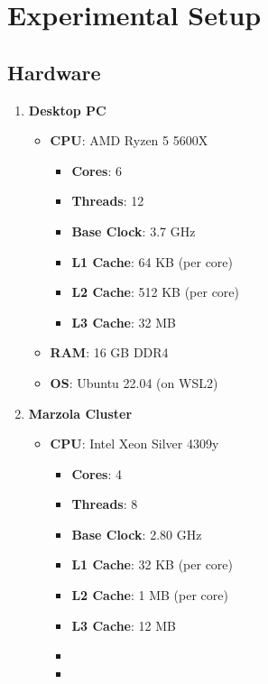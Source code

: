 \documentclass{article}
\begin{document}
\section{Experimental Setup}
\subsection{Hardware}
\begin{minipage}{\textwidth}
    \begin{multicols}{2}
        \raggedcolumns
        \begin{enumerate}
            \item \textbf{Desktop PC}
            \begin{itemize}
                \item \textbf{CPU}: AMD Ryzen 5 5600X
                \begin{itemize}
                    \item \textbf{Cores}: 6
                    \item \textbf{Threads}: 12
                    \item \textbf{Base Clock}: 3.7 GHz
                    \item \textbf{L1 Cache}: 64 KB (per core)
                    \item \textbf{L2 Cache}: 512 KB (per core)
                    \item \textbf{L3 Cache}: 32 MB
                \end{itemize}
                \item \textbf{RAM}: 16 GB DDR4
                \item \textbf{OS}: Ubuntu 22.04 (on WSL2)
            \end{itemize}
            \columnbreak
            \item \textbf{Marzola Cluster}
            \begin{itemize}
                \item \textbf{CPU}: Intel Xeon Silver 4309y
                \begin{itemize}
                    \item \textbf{Cores}: 4
                    \item \textbf{Threads}: 8
                    \item \textbf{Base Clock}: 2.80 GHz
                    \item \textbf{L1 Cache}: 32 KB (per core)
                    \item \textbf{L2 Cache}: 1 MB (per core)
                    \item \textbf{L3 Cache}: 12 MB
                    \item[\vspace{\fill}]
                    \item[\vspace{\fill}]
                \end{itemize}
            \end{itemize}
        \end{enumerate}
    \end{multicols}
\end{minipage}
\end{document}

